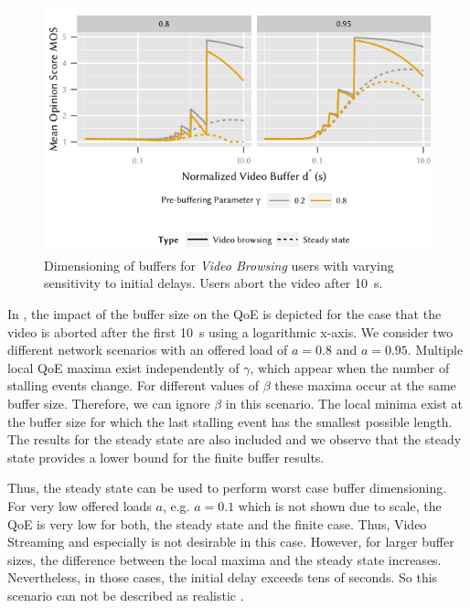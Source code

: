 \begin{figure}
  \centering
  \includegraphics{application/qoe_user_behaviour/user_scenarios/figures/video_browsing}
  \caption{Dimensioning of buffers for \emph{Video Browsing} users with varying  sensitivity to initial delays. Users abort the video after \SI{10}{\second}.}
  \label{fig:application:qoe_user_behaviour:typical_user_scenarios:browsing:video_browsing}
\end{figure}

In , the impact of the buffer size on the \gls{QoE} is depicted for the case that the video is aborted after the first \SI{10}{\second} using a logarithmic x-axis. 
We consider two different network scenarios with an offered load of \(a = 0.8\) and \(a = 0.95\).
Multiple local QoE maxima exist independently of \(\gamma\), which appear when the number of stalling events change. 
For different values of \(\beta\) these maxima occur at the same buffer size.
Therefore, we can ignore \(\beta\) in this scenario. 
The local minima exist at the buffer size for which the last stalling event has the smallest possible length. 
The results for the steady state are also included and we observe that the steady state provides a lower bound for the finite buffer results.

Thus, the steady state can be used to perform worst case buffer dimensioning.
For very low offered loads \(a\), e.g. \(a = 0.1\) which is not shown due to scale, the \gls{QoE} is very low for both, the steady state and the finite case. 
Thus, Video Streaming and especially \videoBrowsing is not desirable in this case. 
However, for larger buffer sizes, the difference between the local maxima and the steady state increases. 
Nevertheless, in those cases, the initial delay exceeds tens of seconds.
So this scenario can not be described as realistic \videoBrowsing.

